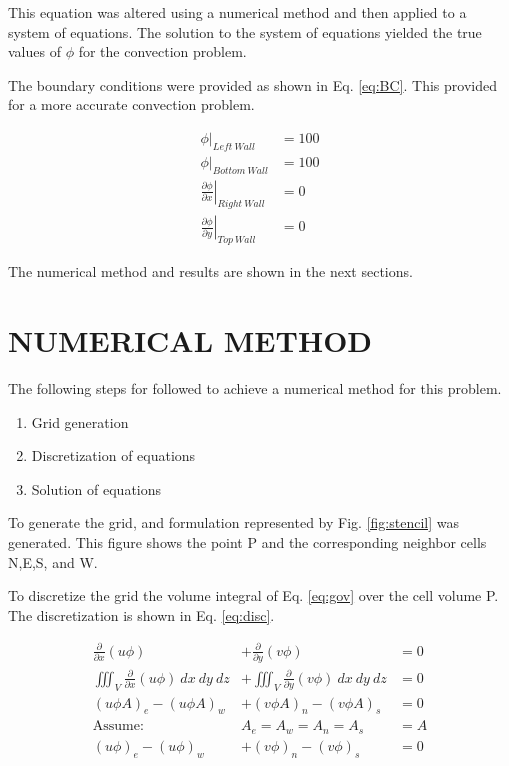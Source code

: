 \documentclass[cleanfoot,cleanhead,twocolumn,10pt,notitlepage]{asme2e}
\begin{document}
This equation was altered using a numerical method and then applied to a system of equations.  The solution to the system of equations yielded the true values of $\phi$ for the convection problem.  

The boundary conditions were provided as shown in Eq. \ref{eq:BC}.  This provided for a more accurate convection problem.  

\begin{equation}
\begin{aligned}
\left.\phi\right|_{Left~Wall} &= 100 \\
\left.\phi\right|_{Bottom~Wall} &= 100 \\
\left. \frac{\partial \phi}{\partial x}\right|_{Right~Wall} &= 0 \\
\left. \frac{\partial \phi}{\partial y}\right|_{Top~Wall} &= 0
\label{eq:BC}
\end{aligned}
\end{equation}

The numerical method and results are shown in the next sections.

\section*{NUMERICAL METHOD}

The following steps for followed to achieve a numerical method for this problem.  

\begin{enumerate}
\item Grid generation
\item Discretization of equations
\item Solution of equations
\end{enumerate}

To generate the grid, and formulation represented by Fig. \ref{fig:stencil} was generated.  This figure shows the point P and the corresponding neighbor cells N,E,S, and W.  

To discretize the grid the volume integral of Eq. \ref{eq:gov} over the cell volume P.  The discretization is shown in Eq. \ref{eq:disc}.

\begin{equation}
\begin{aligned}
\frac{\partial}{\partial x}\left( u \phi \right) &+ \frac{\partial}{\partial y} \left( v \phi \right) &= 0 \\
\iiint_V \frac{\partial}{\partial x}\left( u \phi \right)~dx~dy~dz &+ \iiint_V \frac{\partial}{\partial y} \left( v \phi \right)~dx~dy~dz &= 0 \\
(u\phi A)_e - (u\phi A)_w &+ (v\phi A)_n - (v\phi A)_s &=0\\
\text{Assume: } & A_e = A_w = A_n = A_s &= A \\
(u\phi)_e - (u\phi)_w &+ (v\phi)_n - (v\phi)_s &=0 \\
\label{eq:disc}
\end{aligned}
\end{equation}
\end{document}
